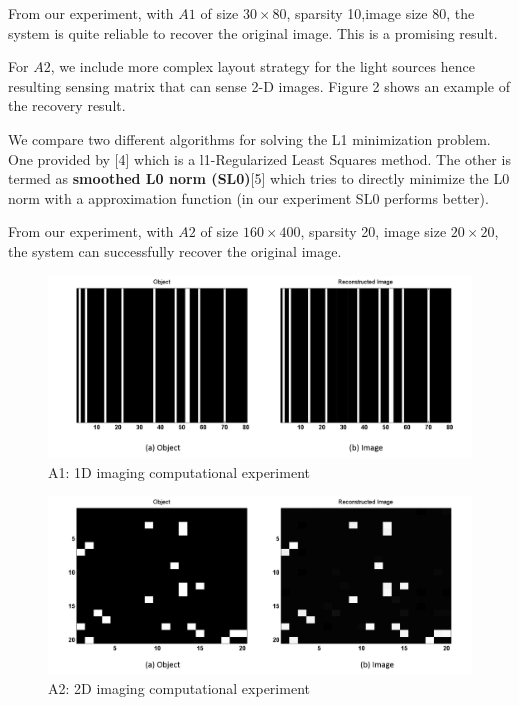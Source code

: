 \documentclass{article} %
\begin{document}
From our experiment, with $A1$ of size $30 \times 80$, sparsity 10,image size 80, the system is quite reliable to recover the original image. This is a promising result.

For $A2$, we include more complex layout strategy for the light sources hence resulting sensing matrix that can sense 2-D images. Figure 2 shows an example of the recovery result.

We compare two different algorithms for solving the L1 minimization problem. One provided by [4] which is a l1-Regularized Least Squares method. The other is termed as \textbf{smoothed L0 norm (SL0)}[5] which tries to directly minimize the L0 norm with a approximation function (in our experiment SL0 performs better).

From our experiment, with $A2$ of size $160 \times 400$, sparsity 20, image size $20 \times 20$, the system can successfully recover the original image. 

\begin{figure}[!t]
\centering
\includegraphics[width=5in]{5.png}
\caption{A1: 1D imaging computational experiment }
\end{figure}

\begin{figure}[!t]
\centering
\includegraphics[width=5in]{6.png}
\caption{A2: 2D imaging computational experiment }
\end{figure}
\end{document}
